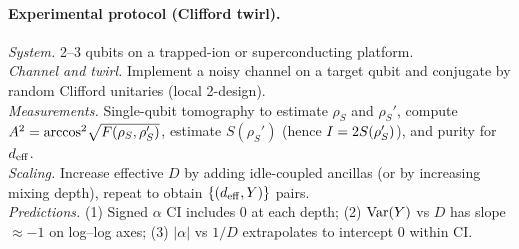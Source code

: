 \paragraph{Experimental protocol (Clifford twirl).}
\emph{System.} 2–3 qubits on a trapped-ion or superconducting platform.\\
\emph{Channel and twirl.} Implement a noisy channel on a target qubit and conjugate by random Clifford unitaries (local 2-design).\\
\emph{Measurements.} Single-qubit tomography to estimate $\rho_S$ and $\rho_S'$, compute $A^2 = \arccos^2\!\sqrt{F(\rho_S,\rho_S')}$,
estimate $S(\rho_S')$ (hence $I=2S(\rho_S')$), and purity for $d_{\mathrm{eff}}$.\\
\emph{Scaling.} Increase effective $D$ by adding idle-coupled ancillas (or by increasing mixing depth), repeat to obtain $\{(d_{\mathrm{eff}},Y)\}$ pairs.\\
\emph{Predictions.} (1) Signed $\alpha$ CI includes $0$ at each depth; (2) $\mathrm{Var}(Y)$ vs $D$ has slope $\approx -1$ on log–log axes; (3) $|\alpha|$ vs $1/D$ extrapolates to intercept $0$ within CI.

